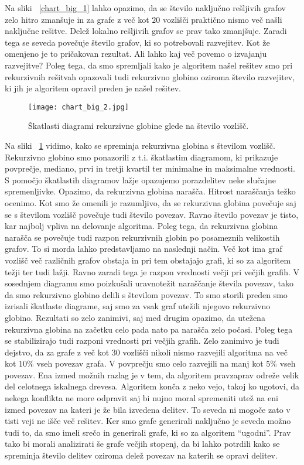 \documentclass[12pt,a4paper,twoside]{article}
\theoremstyle{definition} %
\theoremstyle{plain} %
\numberwithin{equation}{section}  %
\begin{document}
Na sliki ~\ref{chart_big_1} lahko opazimo, da se število naključno rešljivih grafov zelo hitro zmanšuje in za grafe z več kot $20$ vozlišči praktično nismo več našli naključne rešitve. Delež lokalno rešljivih grafov se prav tako zmanjšuje. Zaradi tega se seveda povečuje število grafov, ki so potrebovali razvejitev.  Kot že omenjeno je to pričakovan rezultat. Ali lahko kaj več povemo o izvajanju razvejitve? Poleg tega, da smo spremljali kako je algoritem našel rešitev smo pri rekurzivnih rešitvah opazovali tudi rekurzivno globino oziroma število razvejitev, ki jih je algoritem opravil preden je našel rešitev. 
 \begin{figure}[h!]
\caption{Škatlasti diagrami rekurzivne globine glede na število vozlišč.}
\label{chart_big_2}
\centering
    \texttt{[image: chart\_big\_2.jpg]}
    \end{figure}
Na sliki ~\ref{chart_big_2} vidimo, kako se spreminja rekurzivna globina s številom vozlišč. Rekurzivno globino smo ponazorili z t.i. škatlastim diagramom, ki prikazuje povprečje, mediano, prvi in tretji kvartil ter minimalne in maksimalne vrednosti. S pomočjo škatlastih diagramov lažje opazujemo porazdelitev neke slučajne spremenljivke. Opazimo, da rekurzivna globina narašča. Hitrost naraščanja težko ocenimo. Kot smo že omenili je razumljivo, da se rekurzivna globina povečuje saj se s številom vozlišč povečuje tudi število povezav. Ravno število povezav je tisto, kar najbolj vpliva na delovanje algoritma. Poleg tega, da rekurzivna globina narašča se povečuje tudi razpon rekurzivnih globin po posameznih velikostih grafov. To si morda lahko predstavljamo na naslednji način. Več kot ima graf vozlišč več različnih grafov obstaja in pri tem obstajajo grafi, ki so za algoritem težji ter tudi lažji. Ravno zaradi tega je razpon vrednosti večji pri večjih grafih. V sosednjem diagramu smo poizkušali uravnotežit naraščanje števila povezav, tako da smo rekurzivno globino delili s številom povezav. To smo storili preden smo izrisali škatlaste diagrame, saj smo za vsak graf utežili njegovo rekurzivno globino. Rezultati so zelo zanimivi, saj med drugim opazimo, da utežena rekurzivna globina na začetku celo pada nato pa narašča zelo počasi. Poleg tega se stabilizirajo tudi razponi vrednosti pri večjih grafih. Zelo zanimivo je tudi dejstvo, da za grafe z več kot $30$ vozlišči nikoli nismo razvejili algoritma na več kot $10\%$ vseh povezav grafa. V povprečju smo celo razvejili na manj kot $5\%$ vseh povezav. Ena izmed možnih razlag je v tem, da algoritem pravzaprav odreže velik del celotnega iskalnega drevesa. Algoritem konča z neko vejo, takoj ko ugotovi, da nekega konflikta ne more odpravit saj bi nujno moral spremeniti utež na eni izmed povezav na kateri je že bila izvedena delitev. To seveda ni mogoče zato v tisti veji ne išče več rešitev.  Ker smo grafe generirali naključno je seveda možno tudi to, da smo imeli srečo in generirali grafe, ki so za algoritem ``ugodni''. Prav tako bi morali analizirati še grafe večjih stopenj, da bi lahko potrdili kako se spreminja število delitev oziroma delež povezav na katerih se opravi delitev.
\end{document}
